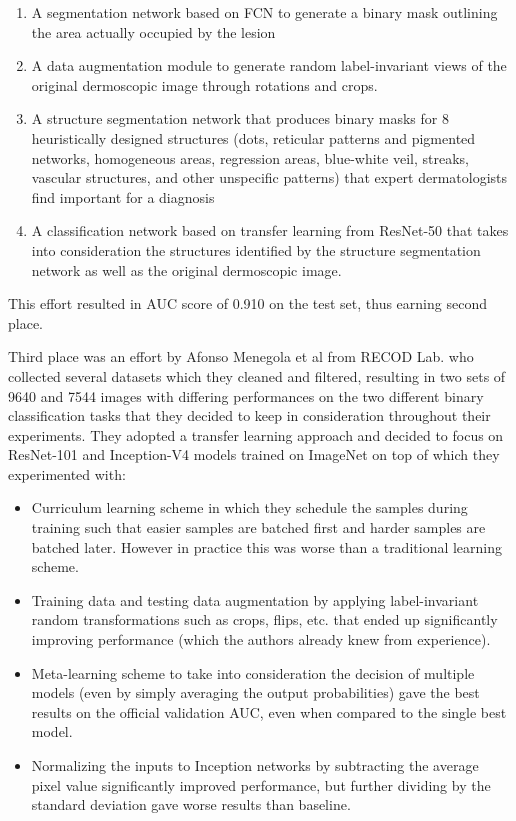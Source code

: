 \begin{enumerate}
    \item A segmentation network based on \ac{FCN} \cite{fcn} to generate a binary mask outlining the area actually occupied by the lesion
    \item A data augmentation module to generate random label-invariant views of the original dermoscopic image through rotations and crops.
    \item A structure segmentation network that produces binary masks for 8 heuristically designed structures (dots, reticular patterns and pigmented networks, homogeneous areas, regression areas, blue-white veil, streaks, vascular structures, and other unspecific patterns) that expert dermatologists find important for a diagnosis
    \item A classification network based on transfer learning from ResNet-50 \cite{resnet} that takes into consideration the structures identified by the structure segmentation network as well as the original dermoscopic image.
\end{enumerate}

This effort resulted in AUC score of 0.910 on the test set, thus earning second place.

Third place was an effort by Afonso Menegola et al \cite{isic2017third} from RECOD Lab. who collected several datasets which they cleaned and filtered, resulting in two sets of 9640 and 7544 images with differing performances on the two different binary classification tasks that they decided to keep in consideration throughout their experiments. They adopted a transfer learning approach and decided to focus on ResNet-101 and Inception-V4 models trained on ImageNet on top of which they experimented with:

\begin{itemize}
    \item Curriculum learning scheme in which they schedule the samples during training such that easier samples are batched first and harder samples are batched later. However in practice this was worse than a traditional learning scheme.
    \item Training data and testing data augmentation by applying label-invariant random transformations such as crops, flips, etc. that ended up significantly improving performance (which the authors already knew from experience).
    \item Meta-learning scheme to take into consideration the decision of multiple models (even by simply averaging the output probabilities) gave the best results on the official validation AUC, even when compared to the single best model.
    \item Normalizing the inputs to Inception networks by subtracting the average pixel value significantly improved performance, but further dividing by the standard deviation gave worse results than baseline.
\end{itemize}

